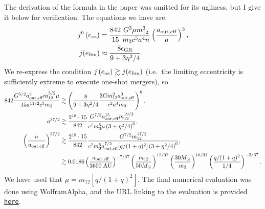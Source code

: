 \documentclass[11pt,
        usenames, %
        dvipsnames %
    ]{article}
\newcommand*{\p}[1]{\left(#1\right)}
\newcommand*{\s}[1]{\left[#1\right]}
\begin{document}
The derivation of the formula in the paper was omitted for its ugliness, but I
give it below for verification. The equations we have are:
\begin{align}
    j^6\p{e_{\rm os}} &= \frac{842}{15}\frac{G^3 \mu m_{12}^3}{m_3c^5a^4n}
        \p{\frac{a_{\rm out, eff}}{a}}^3,\\
    j(e_{\lim}) &\approx \frac{8\epsilon_{\rm GR}}{9 + 3\eta^2/4}.
\end{align}
We re-express the condition $j\p{e_{\rm os}} \gtrsim j(e_{\lim})$ (i.e.\ the
limiting eccentricity is sufficiently extreme to execute one-shot mergers), so
\begin{align}
    842 \frac{G^{5/2}a_{\rm out, eff}^3 m_{12}^{5/2}\mu}{
        15a^{11/2}c^5 m_3}
        &\gtrsim \p{\frac{8}{9 + 3\eta^2/4}
            \frac{3Gm_{12}^2a_{\rm out, eff}^3}{c^2a^4m_3}}^6,\\
    a^{37/2} &\gtrsim \frac{2^{18} \cdot 15}{842} \frac{G^{7/2}a_{\rm
        out, eff}^{15} m_{12}^{19/2}}{c^7 m_3^5 \mu \p{3 + \eta^2/4}^6}
        ,\\
    \p{\frac{a}{a_{\rm out, eff}}}^{37/2} &\gtrsim \frac{2^{18} \cdot 15}{842}
            \frac{G^{7/2} m_{12}^{17/2}}{c^7 m_3^5 a_{\rm out, eff}^{7/2} [q /
            (1 + q)^2] \p{3 + \eta^2/4}^6},\\
        &\gtrsim
            0.0186
            \p{\frac{a_{\rm out, eff}}{3600\;\mathrm{AU}}}^{-7/37}
            \p{\frac{m_{12}}{50M_{\odot}}}^{17/37}
            \p{\frac{30M_{\odot}}{m_3}}^{10/37}
            \p{\frac{q / (1 + q)^2}{1/4}}^{-2/37}.
\end{align}
We have used that $\mu = m_{12}\s{q / (1 + q)^2}$. The final numerical
evaluation was done using WolframAlpha, and the URL linking to the evaluation is
provided
\href{https://www.wolframalpha.com/input/?i=%282%5E%2818%29+*+15+%2F+842+*+G%5E%287%2F2%29+*+%283600+AU%29%5E%28-7%2F2%29+*+%2850+solar+mass%29%5E%2817%2F2%29+%2F+%28c%5E7+*+%2830+solar+mass%29%5E5+*+%281%2F4%29+*+%283%5E6%29%29%29%5E%282%2F37%29}{\texttt{here}}.
\end{document}
